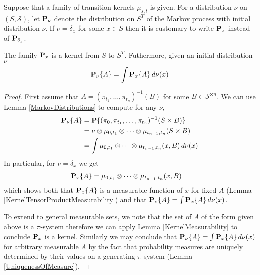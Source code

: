 \begin{defn}Suppose that a family of transition kernels $\mu_{s,t}$ is
  given.  For a distribution $\nu$ on $(S, \mathcal{S})$, let
  $\sprobabilityop{\nu}$ denote the distribution on $S^T$ of the
  Markov process with initial distribution $\nu$.  If $\nu=\delta_x$
  for some $x \in S$ then it is customary to write
  $\sprobabilityop{x}$ instead of $\sprobabilityop{\delta_x}$.
\end{defn}
\begin{lem}\label{MarkovMixtures}The family $\sprobabilityop{x}$ is a kernel from $S$ to
  $S^T$.  Futhermore, given an initial distribution $\nu$
\begin{align*}
\sprobability{A}{\nu} = \int \sprobability{A}{x} \, d\nu(x)
\end{align*}
\end{lem}
\begin{proof}
First assume that $A = (\pi_{t_1}, \dots, \pi_{t_n})^{-1}(B)$ for some
$B \in \mathcal{S}^{\otimes n}$.  We can use Lemma \ref{MarkovDistributions} to compute for
any $\nu$,
\begin{align*}
\sprobability{A}{\nu} &= \probability{(\pi_0, \pi_{t_1}, \dots,
  \pi_{t_n})^{-1}(S \times B)} \\
&=\nu \otimes \mu_{0, t_1} \otimes \cdots \otimes \mu_{t_{n-1}, t_n}(S \times
B) \\
&= \int \mu_{0, t_1} \otimes \cdots \otimes \mu_{t_{n-1}, t_n}(x,B) \, d\nu(x)
\end{align*}
In particular, for $\nu = \delta_x$ we get
\begin{align*}
\sprobability{A}{x} &=\mu_{0, t_1} \otimes \cdots \otimes \mu_{t_{n-1},
  t_n}(x,B)
\end{align*}
which shows both that $\sprobability{A}{x}$ is a measurable function
of $x$ for fixed $A$ (Lemma
\ref{KernelTensorProductMeasurability}) and that
$\sprobability{A}{\nu} = \int \sprobability{A}{x} \, d\nu(x)$.

To extend to general measurable sets, we note that the set of $A$ of
the form given above is a $\pi$-system therefore we can apply Lemma
\ref{KernelMeasurability} to conclude $\sprobabilityop{x}$ is a
kernel.  Similarly we may conclude that $\sprobability{A}{\nu} = \int
\sprobability{A}{x} \, d\nu(x)$ for arbitrary measurable $A$ by the fact that probability measures
are uniquely determined by their values on a generating $\pi$-system
(Lemma \ref{UniquenessOfMeasure}).
\end{proof}

